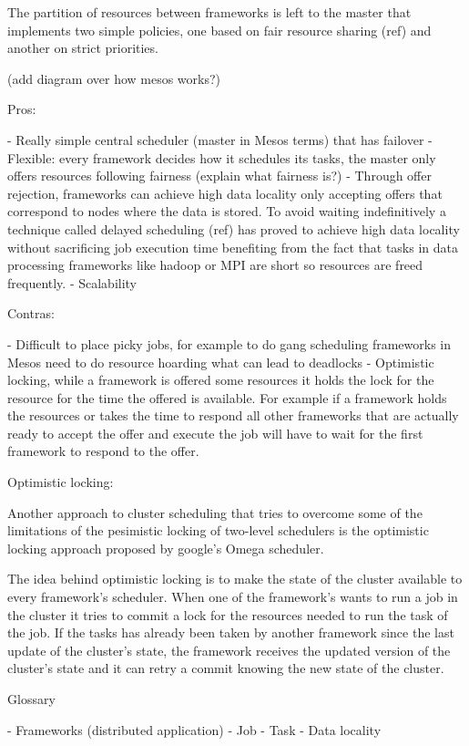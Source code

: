 The partition of resources between frameworks is left to the master
that implements two simple policies, one based on fair resource
sharing (ref) and another on strict priorities.

(add diagram over how mesos works?)


Pros:

- Really simple central scheduler (master in Mesos terms) that has
  failover 
- Flexible: every framework decides how it schedules its tasks, the
master only offers resources following fairness (explain what fairness is?)
- Through offer rejection, frameworks can achieve high data locality
only accepting offers that correspond to nodes where the data is
stored. To avoid waiting indefinitively a technique called delayed
scheduling (ref) has proved to achieve high data locality without
sacrificing job execution time benefiting from the fact that tasks in
data processing frameworks like hadoop or MPI are short so resources
are freed frequently.
- Scalability

Contras:

- Difficult to place picky jobs, for example to do gang scheduling
frameworks in Mesos need to do resource hoarding what can lead to
deadlocks
- Optimistic locking, while a framework is offered some resources it
holds the lock for the resource for the time the offered is
available. For example if a framework holds the resources or takes the
time to respond all other frameworks that are actually ready to accept
the offer and execute the job will have to wait for the first
framework to respond to the offer.

Optimistic locking:

Another approach to cluster scheduling that tries to overcome some of
the limitations of the pesimistic locking of two-level schedulers is
the optimistic locking approach proposed by google's Omega
scheduler.

The idea behind optimistic locking is to make the state of the cluster
available to every framework's scheduler. When one of the framework's
wants to run a job in the cluster it tries to commit a lock for the
resources needed to run the task of the job. If the tasks has already
been taken by another framework since the last update of the cluster's
state, the framework receives the updated version of the cluster's
state and it can retry a commit knowing the new state of the cluster.



Glossary

- Frameworks (distributed application)
- Job
- Task
- Data locality
